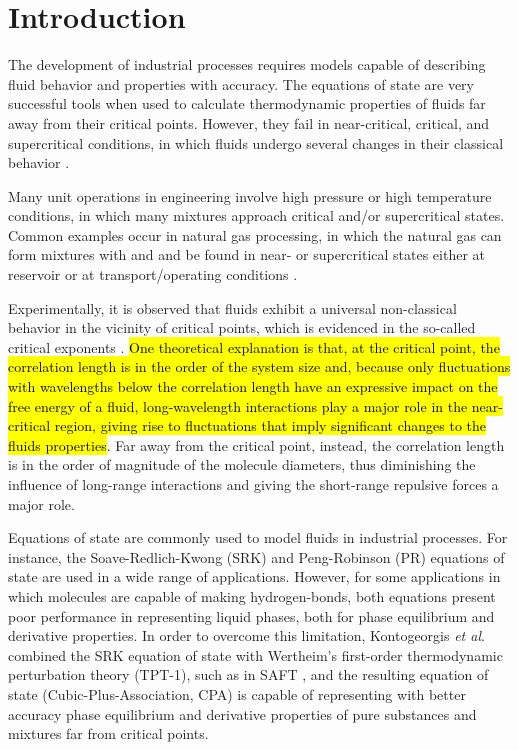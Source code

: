 \documentclass[preprint,12pt,3p]{elsarticle}
\begin{document}
\section{Introduction}

    The development of industrial processes requires models capable of describing fluid behavior and properties with accuracy. The equations of state are very successful tools when used to calculate thermodynamic properties of fluids far away from their critical points. However, they fail in near-critical, critical, and supercritical conditions, in which fluids undergo several changes in their classical behavior \cite{sengers1986thermodynamic}.
    
	Many unit operations in engineering involve high pressure or high temperature conditions, in which many mixtures approach critical and/or supercritical states. Common examples occur in natural gas processing, in which the natural gas can form mixtures with  and  and be found in near- or supercritical states either at reservoir or at transport/operating conditions \citep{kermani2003carbon}.

    Experimentally, it is observed that fluids exhibit a universal non-classical behavior in the vicinity of critical points, which is evidenced in the so-called critical exponents \cite{carles2010brief}. \hl{One theoretical explanation is that, at the critical point, the correlation length is in the order of the system size and, because only fluctuations with wavelengths below the correlation length have an expressive impact on the free energy of a fluid, long-wavelength interactions play a major role in the near-critical region, giving rise to fluctuations that imply significant changes to the fluids properties}. Far away from the critical point, instead, the correlation length is in the order of magnitude of the molecule diameters, thus diminishing the influence of long-range interactions and giving the short-range repulsive forces a major role.
    
    Equations of state are commonly used to model fluids in industrial processes. For instance, the Soave-Redlich-Kwong (SRK) \cite{soave1972equilibrium} and Peng-Robinson (PR) \cite{peng1976new} equations of state are used in a wide range of applications. However, for some applications in which molecules are capable of making hydrogen-bonds, both equations present poor performance in representing liquid phases, both for phase equilibrium and derivative properties. In order to overcome this limitation, Kontogeorgis \textit{et al}.  \cite{kontogeorgis1996equation} combined the SRK equation of state with Wertheim's first-order thermodynamic perturbation theory (TPT-1), such as in SAFT \cite{chapman1990new}, and the resulting equation of state (Cubic-Plus-Association, CPA) is capable of representing with better accuracy phase equilibrium and derivative properties of pure substances and mixtures far from critical points.
    
\end{document}
